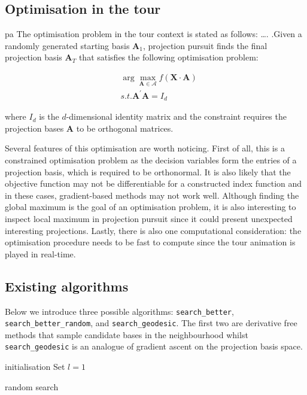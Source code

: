\hypertarget{tour-optim}{%
\subsection{Optimisation in the tour}\label{tour-optim}}

pa The optimisation problem in the tour context is stated as follows:
\ldots. .Given a randomly generated starting basis \(\mathbf{A}_1\),
projection pursuit finds the final projection basis \(\mathbf{A}_T\)
that satisfies the following optimisation problem:

\begin{align}
&\arg \max_{\mathbf{A} \in \mathcal{A}} f(\mathbf{X} \cdot \mathbf{A}) \\
&s.t.  \mathbf{A}^{\prime} \mathbf{A} = I_d
\end{align}

\noindent where \(I_d\) is the \(d\)-dimensional identity matrix and the
constraint requires the projection bases \(\mathbf{A}\) to be orthogonal
matrices.

Several features of this optimisation are worth noticing. First of all,
this is a constrained optimisation problem as the decision variables
form the entries of a projection basis, which is required to be
orthonormal. It is also likely that the objective function may not be
differentiable for a constructed index function and in these cases,
gradient-based methods may not work well. Although finding the global
maximum is the goal of an optimisation problem, it is also interesting
to inspect local maximum in projection pursuit since it could present
unexpected interesting projections. Lastly, there is also one
computational consideration: the optimisation procedure needs to be fast
to compute since the tour animation is played in real-time.

\hypertarget{existing-algorithms}{%
\subsection{Existing algorithms}\label{existing-algorithms}}

Below we introduce three possible algorithms: \texttt{search\_better},
\texttt{search\_better\_random}, and \texttt{search\_geodesic}. The
first two are derivative free methods that sample candidate bases in the
neighbourhood whilst \texttt{search\_geodesic} is an analogue of
gradient ascent on the projection basis space.

\begin{algorithm}
\SetAlgoLined
  initialisation\;
  Set $l = 1$\;
  \caption{random search}
  \label{random-search}
\end{algorithm}

